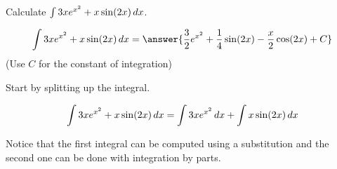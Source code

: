 \documentclass{ximera}
\author{Jim Talamo}
\begin{document}
\begin{exercise}
Calculate $\int 3xe^{x^2} +x \sin(2x) \mathop{}\!d x $.


\[
\int 3xe^{x^2} +x \sin(2x) \d x = \answer{\frac{3}{2}e^{x^2}+\frac{1}{4}\sin(2x)-\frac{x}{2}\cos(2x)  + C } 
\]
(Use $C$ for the constant of integration)

\begin{hint}
Start by splitting up the integral.

\[
\int 3xe^{x^2} +x \sin(2x) \mathop{}\!d x = \int 3xe^{x^2} \mathop{}\!d x + \int x \sin(2x) \mathop{}\!d x
\]

Notice that the first integral can be computed using a substitution and the second one can be done with integration by parts.

\end{hint}

\end{exercise}
\end{document}
